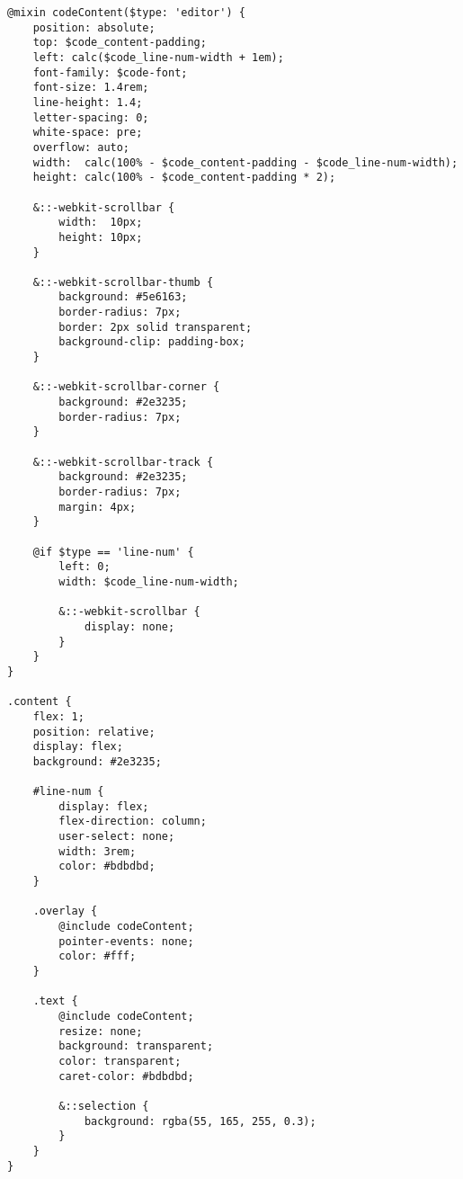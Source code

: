 \documentclass[autodetect-engine,dvi=dvipdfmx,ja=standard,
               a4j,11pt]{bxjsarticle}
\begin{document}
\begin{lstlisting}[caption={{\tt style.scss(コンテンツ部抜粋)}(オーバレイ)}, label={prog:overlay-scss}]
@mixin codeContent($type: 'editor') {
    position: absolute;
    top: $code_content-padding;
    left: calc($code_line-num-width + 1em);
    font-family: $code-font;
    font-size: 1.4rem;
    line-height: 1.4;
    letter-spacing: 0;
    white-space: pre;
    overflow: auto;
    width:  calc(100% - $code_content-padding - $code_line-num-width);
    height: calc(100% - $code_content-padding * 2);

    &::-webkit-scrollbar {
        width:  10px; 
        height: 10px;
    }

    &::-webkit-scrollbar-thumb {
        background: #5e6163;
        border-radius: 7px;
        border: 2px solid transparent;
        background-clip: padding-box;
    }

    &::-webkit-scrollbar-corner {
        background: #2e3235;
        border-radius: 7px;
    }

    &::-webkit-scrollbar-track {
        background: #2e3235;
        border-radius: 7px;
        margin: 4px;
    }

    @if $type == 'line-num' {
        left: 0;
        width: $code_line-num-width;
        
        &::-webkit-scrollbar {
            display: none;
        }
    }
}

.content {
    flex: 1;
    position: relative;
    display: flex;
    background: #2e3235;

    #line-num {
        display: flex;
        flex-direction: column;
        user-select: none;
        width: 3rem;
        color: #bdbdbd;
    }

    .overlay {
        @include codeContent;
        pointer-events: none;
        color: #fff;
    }

    .text {
        @include codeContent;
        resize: none;
        background: transparent;
        color: transparent;
        caret-color: #bdbdbd;

        &::selection {
            background: rgba(55, 165, 255, 0.3);
        }
    }
}
\end{lstlisting}
\end{document}
